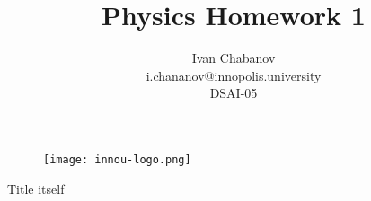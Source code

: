 \begin{titlepage}

    \title{Physics Homework 1}
    \author{Ivan Chabanov\\i.chananov@innopolis.university\\DSAI-05}

    \begin{figure}[t]
        \centering
        \texttt{[image: innou-logo.png]} %
    \end{figure}

    Title itself
    \maketitle




\end{titlepage}